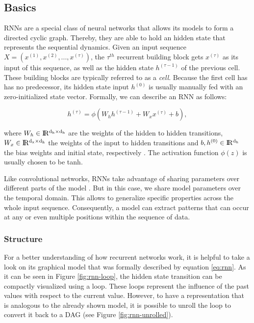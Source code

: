 \subsection{Basics}

RNNs are a special class of neural networks that allows its models to form a directed cyclic graph. Thereby, they are able to hold an hidden state that represents the sequential dynamics. Given an input sequence $ X = (x^{(1)}, x^{(2)},..., x^{(\tau)}) $, the $ \tau^{th} $ recurrent building block gets $x^{(\tau)}$ as its input of this sequence, as well as the hidden state $h^{(\tau-1)}$ of the previous cell. These building blocks are typically referred to as a \textit{cell}. Because the first cell has has no predecessor, its hidden state input $ h^{(0)} $ is usually manually fed with an zero-initialized state vector. Formally, we can describe an RNN as follows:

\begin{equation} \label{eq:rnn}
  h^{(\tau)} = \phi(W_{h} h^{(\tau-1)} + W_{x} x^{(\tau)} + b) ,
\end{equation}

where $ W_{h} \in \rm I\!R^{d_h \times d_h} $ are the weights of the hidden to hidden transitions, $ W_{x} \in \rm I\!R^{d_x \times d_h} $ the weights of the input to hidden transitions and $ b, h^{(0)} \in \rm I\!R^{d_h} $ the bias weights and initial state, respectively \parencite[p. 2]{rnn-batchnorm}. The activation function $ \phi(z) $ is usually chosen to be tanh.

Like convolutional networks, RNNs take advantage of sharing parameters over different parts of the model \parencite[p. 374]{deep_learning}. But in this case, we share model parameters over the temporal domain. This allows to generalize specific properties across the whole input sequence. Consequently, a model can extract patterns that can occur at any or even multiple positions within the sequence of data.

\subsubsection{Structure}

For a better understanding of how recurrent networks work, it is helpful to take a look on its graphical model that was formally described by equation \ref{eq:rnn}. As it can be seen in Figure \ref{fig:rnn-loop}, the hidden state transition can be compactly visualized using a loop. These loops represent the influence of the past values with respect to the current value. However, to have a representation that is analogous to the already shown model, it is possible to unroll the loop to convert it back to a DAG (see Figure \ref{fig:rnn-unrolled}).

